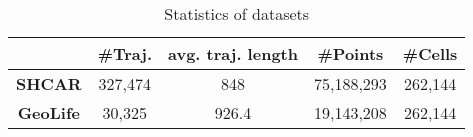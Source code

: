 \documentclass[10pt,conference,letterpaper]{IEEEtran}
\begin{document}
%
%

\begin{table}[t]
	\renewcommand{\arraystretch}{1.1}
	
	\caption{Statistics of datasets}\label{tab:datasets}
	\vspace{-.1in}
	\centering
	\scriptsize{
		\begin{tabular}{|c|c|c|c|c|}
			\hline
			& \textbf{\#Traj.} & \textbf{avg. traj. length} & \textbf{\#Points} & \textbf{\#Cells}\\
			\hline
			\textbf{SHCAR} & 327,474 & 848 & 75,188,293& 262,144\\
			\hline
			\textbf{GeoLife} & 30,325 & 926.4 & 19,143,208& 262,144\\
			\hline
		\end{tabular}
	}
	\vspace{-.1in}
\end{table}
\end{document}
